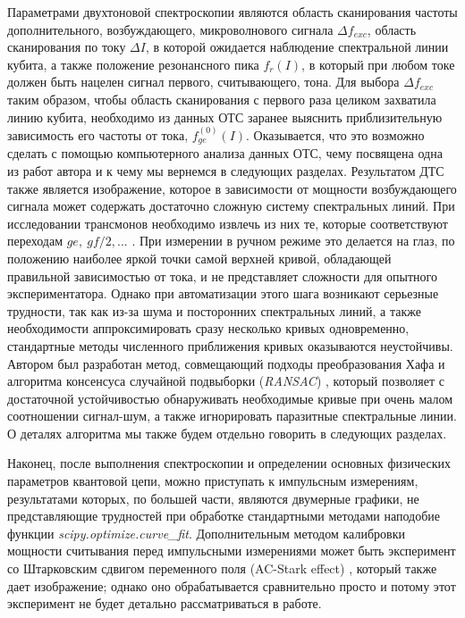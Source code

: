 \documentclass[14pt, a4paper]{extreport}
\numberwithin{equation}{section}
\begin{document}
Параметрами двухтоновой спектроскопии являются область сканирования частоты дополнительного, возбуждающего, микроволнового сигнала $\Delta f_{exc}$, область сканирования по току $\Delta I$, в которой ожидается наблюдение спектральной линии кубита, а также положение резонансного пика $f_r(I)$, в который при любом токе должен быть нацелен сигнал первого, считывающего, тона. Для выбора $\Delta f_{exc}$ таким образом, чтобы область сканирования с первого раза целиком захватила линию кубита, необходимо из данных ОТС заранее выяснить приблизительную зависимость его частоты от тока, $f_{ge}^{(0)}(I)$. Оказывается, что это возможно сделать с помощью компьютерного анализа данных ОТС, чему посвящена одна из работ автора \cite{fedorov2019automated} и к чему мы вернемся в следующих разделах. Результатом ДТС также является изображение, которое в зависимости от мощности возбуждающего сигнала может содержать достаточно сложную систему спектральных линий. При исследовании трансмонов необходимо извлечь из них те, которые соответствуют переходам $ge,\ gf/2,...$ \cite{fedorov2017}. При измерении в ручном режиме это делается на глаз, по положению наиболее яркой точки самой верхней кривой, обладающей правильной зависимостью от тока, и не представляет сложности для опытного экспериментатора. Однако при автоматизации этого шага возникают серьезные трудности, так как из-за шума и посторонних спектральных линий, а также необходимости аппроксимировать сразу несколько кривых одновременно, стандартные методы численного приближения кривых оказываются неустойчивы. Автором был разработан метод, совмещающий подходы преобразования Хафа \cite{hough1962} и алгоритма консенсуса случайной подвыборки (\textit{RANSAC}) \cite{fischler1981}, который позволяет с достаточной устойчивостью обнаруживать необходимые кривые при очень малом соотношении сигнал-шум, а также игнорировать паразитные спектральные линии. О деталях алгоритма мы также будем отдельно говорить в следующих разделах.

Наконец, после выполнения спектроскопии и определении основных физических параметров квантовой цепи, можно приступать к импульсным измерениям, результатами которых, по большей части, являются двумерные графики, не представляющие трудностей при обработке стандартными методами наподобие функции \textit{scipy.optimize.curve\_fit}. Дополнительным методом калибровки мощности считывания перед импульсными измерениями может быть эксперимент со Штарковским сдвигом переменного поля (AC-Stark effect) \cite{schuster2005ac}, который также дает изображение; однако оно обрабатывается сравнительно просто и потому этот эксперимент не будет детально рассматриваться в работе.
\end{document}
